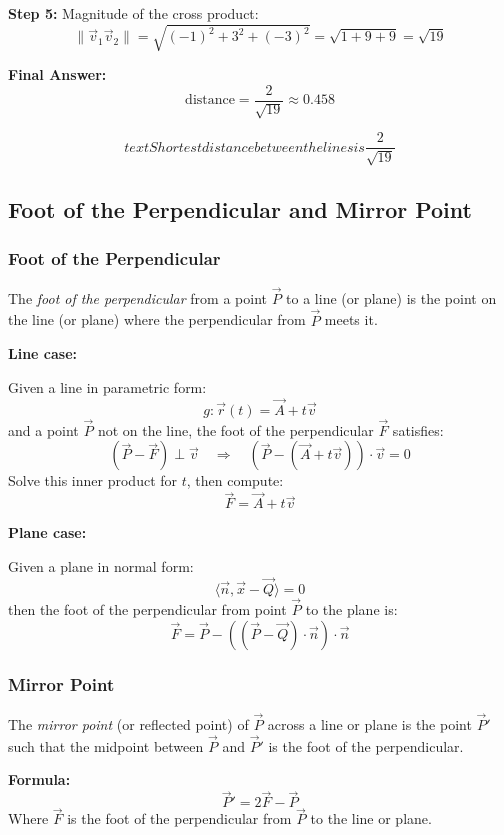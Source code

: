 \textbf{Step 5:} Magnitude of the cross product:
\[
	\|\vec{v}_1  \vec{v}_2\|= \sqrt{(-1)^2 + 3^2 + (-3)^2} = \sqrt{1 + 9 + 9} = \sqrt{19}
\]

\textbf{Final Answer:}
\[
	\text{distance} = \frac{2}{\sqrt{19}} \approx 0.458
\]

\[
text{Shortest distance between the lines is } \frac{2}{\sqrt{19}}
\]

\subsection{Foot of the Perpendicular and Mirror Point}

\subsubsection{Foot of the Perpendicular}

The \emph{foot of the perpendicular} from a point \(\vec{P}\) to a line (or plane) is the point on the line (or plane) where the perpendicular from \(\vec{P}\) meets it.
\vspace{\baselineskip}

\textbf{Line case:}

Given a line in parametric form:
\[
	g: \vec{r}(t) = \vec{A} + t\vec{v}
\]
and a point \(\vec{P}\) not on the line, the foot of the perpendicular \(\vec{F}\) satisfies:
\[
	(\vec{P} - \vec{F}) \perp \vec{v} \quad \Rightarrow \quad (\vec{P} - (\vec{A} + t\vec{v})) \cdot \vec{v} = 0
\]
Solve this inner product for \(t\), then compute:
\[
	\vec{F} = \vec{A} + t\vec{v}
\]

\textbf{Plane case:}

Given a plane in normal form:
\[
	\langle \vec{n}, \vec{x} - \vec{Q} \rangle = 0
\]
then the foot of the perpendicular from point \(\vec{P}\) to the plane is:
\[
	\vec{F} = \vec{P} - ((\vec{P} - \vec{Q}) \cdot \vec{n}) \cdot \vec{n}
\]

\subsubsection{Mirror Point}

The \emph{mirror point} (or reflected point) of \(\vec{P}\) across a line or plane is the point \(\vec{P}'\) such that the midpoint between \(\vec{P}\) and \(\vec{P}'\) is the foot of the perpendicular.

\textbf{Formula:}
\[
	\vec{P}' = 2\vec{F} - \vec{P}
\]
Where \(\vec{F}\) is the foot of the perpendicular from \(\vec{P}\) to the line or plane.
